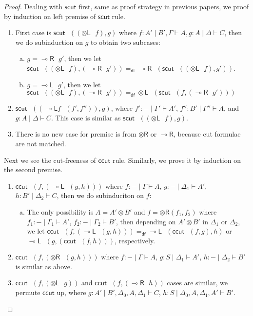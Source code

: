 \documentclass[submission,copyright,creativecommons]{eptcs}
\newcommand{\tl}{\otimes \mathsf{L}}
\newcommand{\tr}{\otimes \mathsf{R}}
\newcommand{\lright}{\multimap \mathsf{R}}
\newcommand{\lleft}{\multimap \mathsf{L}}
\newcommand{\ot}{\otimes}
\newcommand{\defeq}{=_{\mathsf{df}}}
\begin{document}
\begin{proof}
  Dealing with $\mathsf{scut}$ first, same as proof strategy in previous papers, we proof by induction on left premise of $\mathsf{scut}$ rule.
  \begin{enumerate}[1. ]
    \item First case is $\mathsf{scut} \text{ } ((\tl \text{ } f), g)$ where $f : A' \mid B' , \Gamma \vdash A, g : A \mid \Delta \vdash C$, then we do subinduction on $g$ to obtain two subcases:
          \begin{enumerate}[a. ]
            \item $g = \lright \text{ } g'$, then we let $\mathsf{scut} \text{ } ((\tl \text{ } f), (\lright \text{ } g')) \defeq \lright \text{ } (\mathsf{scut} \text{ } ((\tl \text{ } f), g'))$.
            \item $g = \lleft \text{ } g'$, then we let $\mathsf{scut} \text{ } ((\tl \text{ } f), (\lright \text{ } g')) \defeq \tl \text{ } (\mathsf{scut} \text{ } (f, (\lright \text{ } g')))$
          \end{enumerate}
    \item $\mathsf{scut} \text{ } ((\lleft f \text{ } (f' , f'')), g)$, where $f' : - \mid \Gamma' \vdash A'$, $f'' : B' \mid \Gamma'' \vdash A$, and $g : A \mid \Delta \vdash C$.
    This case is similar as $\mathsf{scut} \text{ } ((\tl \text{ } f), g)$.
    \item There is no new case for premise is from $\tr$ or $\lright$, because cut formulae are not matched.
  \end{enumerate}
  Next we see the cut-freeness of $\mathsf{ccut}$ rule.
  Similarly, we prove it by induction on the second premise.
  \begin{enumerate}[1. ]
    \item $\mathsf{ccut} \text{ } (f , (\lleft \text{ } (g, h)))$ where $f : - \mid \Gamma \vdash A$, $g : - \mid \Delta_1 \vdash A'$, $h : B' \mid \Delta_2 \vdash C$, then we do subinduciton on $f$:
    \begin{enumerate}[a. ]
      \item The only possibility is $A = A' \ot B'$ and $f = \tr (f_1, f_2)$ where $f_1 : - \mid \Gamma_1 \vdash A'$, $f_2 : - \mid \Gamma_2 \vdash B'$, then depending on $A' \ot B'$ in $\Delta_1$ or $\Delta_2$,
      we let $\mathsf{ccut} \text{ } (f , (\lleft \text{ } (g, h))) \defeq \lleft \text{ } (\mathsf{ccut} \text{ } (f, g), h)$ or $ \lleft \text{ } (g, (\mathsf{ccut} \text{ } (f, h)))$, respectively.
    \end{enumerate}
    \item $\mathsf{ccut} \text{ } (f , (\tr \text{ } (g, h)))$ where $f : - \mid \Gamma \vdash A$, $g : S \mid \Delta_1 \vdash A'$, $h : - \mid \Delta_2 \vdash B'$ is similar as above.
    \item $\mathsf{ccut} \text{ } (f, (\tl \text{ } g))$ and
    $\mathsf{ccut} \text{ } (f, (\lright \text{ } h))$ cases are similar, we permute $\mathsf{ccut}$ up,
    where $g : A' \mid B' , \Delta_0 , A , \Delta_1 \vdash C$, $h : S \mid \Delta_0 , A , \Delta_1 , A' \vdash B'$.
  \end{enumerate}
\end{proof}
\end{document}
